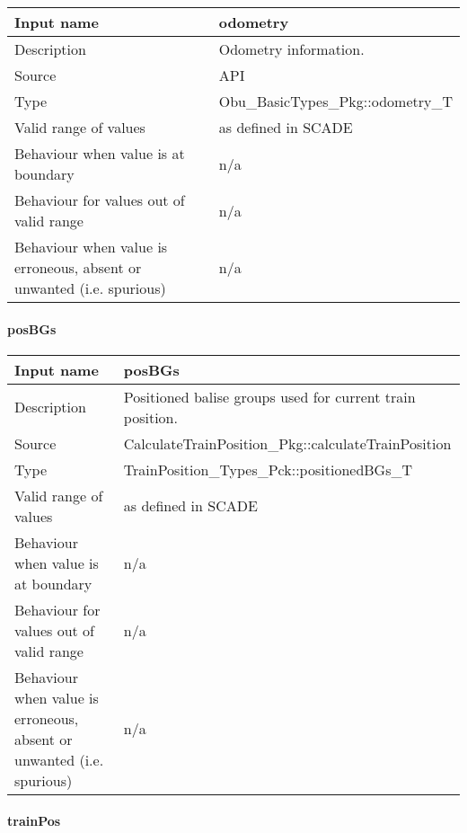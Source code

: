 \begin{longtable}{p{}p{}}
\toprule
Input name				& odometry \\
\midrule
Description				& Odometry information.\\
\midrule
Source					& API \\ 
\midrule
Type					& Obu\_BasicTypes\_Pkg::odometry\_T \\
\midrule
Valid range of values	& as defined in SCADE \\
\midrule
Behaviour when value is at boundary	& n/a \\
\midrule
Behaviour for values out of valid range	& n/a \\
\midrule
Behaviour when value is erroneous, absent or unwanted (i.e. spurious) & n/a \\
\bottomrule
\end{longtable}

\paragraph{posBGs}

\begin{longtable}{p{}p{}}
\toprule
Input name				& posBGs \\
\midrule
Description				& Positioned balise groups used for current train position. \\
\midrule
Source					& CalculateTrainPosition\_Pkg::calculateTrainPosition \\ 
\midrule
Type					& TrainPosition\_Types\_Pck::positionedBGs\_T \\
\midrule
Valid range of values	& as defined in SCADE \\
\midrule
Behaviour when value is at boundary	& n/a \\
\midrule
Behaviour for values out of valid range	& n/a \\
\midrule
Behaviour when value is erroneous, absent or unwanted (i.e. spurious) & n/a \\
\bottomrule
\end{longtable}

\paragraph{trainPos}

